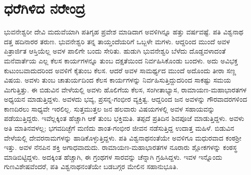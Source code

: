 
\chapter{ಧರೆಗಿಳಿದ ನರೇಂದ್ರ}

\noindent

ಭುವನೇಶ್ವರೀ ದೇವಿ ಮದುವೆಯಾಗಿ ಪತಿಗೃಹ ಪ್ರವೇಶ ಮಾಡಿದಾಗ ಅವಳಿಗಿನ್ನೂ ಹತ್ತು ವರ್ಷವಷ್ಟೆ. ಪತಿ ವಿಶ್ವನಾಥ ದತ್ತ ಹದಿನಾರರ ತರುಣ. ಭುವನೇಶ್ವರಿ ತನ್ನ ತಾಯ್ತಂದೆಯರಿಗೆ ಒಬ್ಬಳೇ ಮಗಳು. ಆದ್ದರಿಂದ ಮುಂದೆ ಅವಳ ಪಿತ್ರಾರ್ಜಿತ ಆಸ್ತಿಯೆಲ್ಲ ಅವಳ ಪಾಲಿಗೇ ಬಂದು ಸೇರಿತು. ಹುಡುಗಿ ಭುವನೇಶ್ವರಿ ಬೆಳೆದು ದೊಡ್ಡವಳಾದಂತೆ ಮನೆವಾರ್ತೆಯ ಎಲ್ಲ ಕೆಲಸ ಕಾರ್ಯಗಳನ್ನೂ ತುಂಬ ದಕ್ಷತೆಯಿಂದ ನಿರ್ವಹಿಸಿಕೊಂಡು ಬಂದಳು. ಅದು ಅವಿಭಕ್ತ ಕುಟುಂಬವಾದುದರಿಂದ ಅವಳಿಗೆ ಕೈತುಂಬ ಕೆಲಸ. ಆದರೆ ಅವಳ ಸಾಮರ್ಥ್ಯದ ಮುಂದೆ ಅದೊಂದು ತೀರಾ ಸಣ್ಣ ವಿಷಯ. ಅವಳು ತುಂಬ ಚಾತುರ್ಯದಿಂದ ಕೆಲಸ ಕಾರ್ಯಗಳನ್ನು ನಿರ್ವಹಿಸುತ್ತಿದ್ದುದರಿಂದ ಸಾಕಷ್ಟು ಸಮಯ ಮಿಗುತ್ತಿತ್ತು. ಈ ಬಿಡುವಿನ ವೇಳೆಯಲ್ಲಿ ಅವಳು ಹೊಲಿಗೆಯ ಕೆಲಸ, ಸಂಗೀತಾಭ್ಯಾಸ, ರಾಮಾಯಣ-ಮಹಾಭಾರತಗಳ ಅಧ್ಯಯನ ಮಾಡುತ್ತಿದ್ದಳು. ಅವಳದು ಭವ್ಯ, ಪ್ರಸನ್ನ-ಗಂಭೀರ ವ್ಯಕ್ತಿತ್ವ. ಆದ್ದರಿಂದ ಜನ ಅವಳನ್ನು ಗೌರವಾದರಗಳಿಂದ ಕಾಣದಿರಲು ಸಾಧ್ಯವೇ ಇರಲಿಲ್ಲ. ಸುತ್ತಮುತ್ತಲ ಜನ ಹಲವಾರು ವಿಷಯಗಳಲ್ಲಿ ಅವಳ ಸಹಾಯವನ್ನು ಪಡೆಯುತ್ತಿದ್ದರು. ಇವೆಲ್ಲಕ್ಕಿಂತ ಹೆಚ್ಚಾಗಿ ಆಕೆ ತುಂಬ ಭಕ್ತಿಮತಿ. ತಪ್ಪದೆ ಪ್ರತಿದಿನ ಶಿವಪೂಜೆ ಮಾಡುತ್ತಿದ್ದಳು. ಅವಳು ಅತಿ ಮಾತಿನವಳಲ್ಲ; ಭಗವದಿಚ್ಛೆಗೆ ಮಣಿದು ಶಾಂತ-ಗಂಭೀರ ಜೀವನ ನಡೆಸುತ್ತಿದ್ದ ಉದಾತ್ತ ಮಹಿಳೆ. ಬಿಡುವಿನ ವೇಳೆಯಲ್ಲಿ ದೇವರನಾಮಗಳನ್ನು ಹಾಡಿಕೊಳ್ಳುತ್ತಿದ್ದಳು. ಪತಿ ವಿಶ್ವನಾಥನಂತೆಯೇ ಅವಳಿಗೂ ಮಧುರವಾದ ಕಂಠಶ್ರೀ ಇತ್ತು. ಅವಳ ನೆನಪಿನ ಶಕ್ತಿ ಅಗಾಧವಾದುದು. ರಾಮಾಯಣ-ಮಹಾಭಾರತಗಳ ನೂರಾರು ಶ್ಲೋಕಗಳನ್ನು ಕಂಠಸ್ಥ ಮಾಡಿಬಿಟ್ಟಿದ್ದಳು. ಅದಕ್ಕಿಂತ ಹೆಚ್ಚಾಗಿ, ಈ ಗ್ರಂಥಗಳ ಸಾರವನ್ನು ಚೆನ್ನಾಗಿ ಗ್ರಹಿಸಿದ್ದಳು. ಇವಳ ಇನ್ನೊಂದು ಗುಣವಿಶೇಷವೆಂದರೆ, ಪತಿ ವಿಶ್ವನಾಥನಂತೆಯೇ ಬಡಬಗ್ಗರ ಮೇಲಿನ ಸಹಾನುಭೂತಿ.

